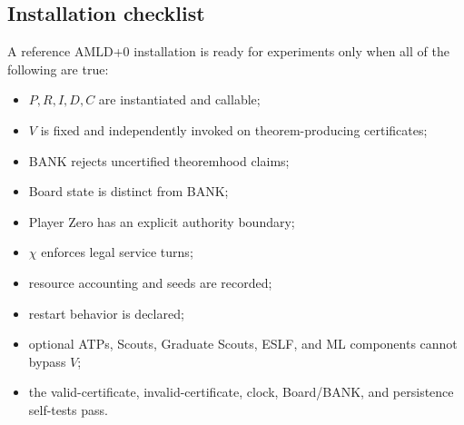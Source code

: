 \documentclass[11pt]{article}
\theoremstyle{definition}
\begin{document}
\subsection{Installation checklist}

A reference AMLD+0 installation is ready for experiments only when all of the following are true:
\begin{itemize}[leftmargin=*]
\item $P,R,I,D,C$ are instantiated and callable;
\item $V$ is fixed and independently invoked on theorem-producing certificates;
\item BANK rejects uncertified theoremhood claims;
\item Board state is distinct from BANK;
\item Player Zero has an explicit authority boundary;
\item $\chi$ enforces legal service turns;
\item resource accounting and seeds are recorded;
\item restart behavior is declared;
\item optional ATPs, Scouts, Graduate Scouts, ESLF, and ML components cannot bypass $V$;
\item the valid-certificate, invalid-certificate, clock, Board/BANK, and persistence self-tests pass.
\end{itemize}
\end{document}

